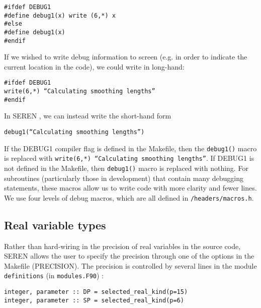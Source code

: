 \documentclass[a4paper]{article}
\newcommand{\NAME}{SEREN }
\newcommand{\var}[1]{\texttt{#1}}
\begin{document}
\noindent \var{\#ifdef DEBUG1} \\
\var{\#define debug1(x)   write (6,*) x} \\
\noindent\var{\#else} \\
\var{\#define debug1(x)} \\
\noindent\var{\#endif} \newline

If we wished to write debug information to screen (e.g. in order to indicate the current location in the code), we could write in long-hand: \newline

\noindent \var{\#ifdef DEBUG1} \\ 
\var{write(6,*) ``Calculating smoothing lengths''} \\ 
\noindent\var{\#endif} \newline

In \NAME, we can instead write the short-hand form
\newline

\noindent \var{debug1(``Calculating smoothing lengths'')}
\newline

If the DEBUG1 compiler flag is defined in the Makefile, then the 
\var{debug1()} macro is replaced with 
\var{write(6,*) ``Calculating smoothing lengths''}.  
If DEBUG1 is not defined in the Makefile, then \var{debug1()} macro is replaced with nothing. For subroutines (particularly those in development) that contain many debugging statements, these macros allow us to write code with more clarity and fewer lines. We use four levels of debug macros, which are all defined in \var{/headers/macros.h}. 



\subsection{Real variable types} \label{SS:VARTYPES}
Rather than hard-wiring in the precision of real variables in the source code, \NAME allows the user to specify the precision through one of the options in the Makefile (PRECISION).  The precision is controlled by several lines in the module \var{definitions} (in \var{modules.F90}) : \newline

\indent \var{integer, parameter :: DP = selected\_real\_kind(p=15)} \\
\indent \var{integer, parameter :: SP = selected\_real\_kind(p=6)}  \\ 
\end{document}
